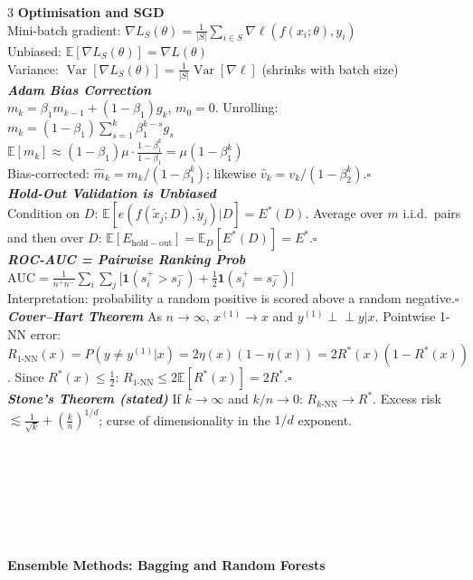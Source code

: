 \documentclass[a4paper,7pt]{article}
\begin{document}
\begin{multicols*}{3}
\textbf{Optimisation and SGD}\\
Mini-batch gradient: $\nabla L_S(\theta)=\frac{1}{|S|}\sum_{i\in S}\nabla\ell(f(x_i;\theta),y_i)$\\
Unbiased: $\mathbb{E}[\nabla L_S(\theta)]=\nabla L(\theta)$\\
Variance: $\operatorname{Var}[\nabla L_S(\theta)]=\frac{1}{|S|}\operatorname{Var}[\nabla\ell]$ (shrinks with batch size)\\

\textit{\textbf{Adam Bias Correction}}\\
$m_k=\beta_1 m_{k-1}+(1-\beta_1)g_k$, $m_0=0$. Unrolling:\\
$m_k=(1-\beta_1)\sum_{s=1}^k\beta_1^{k-s}g_s$\\
$\mathbb{E}[m_k]\approx(1-\beta_1)\mu\cdot\frac{1-\beta_1^k}{1-\beta_1}=\mu(1-\beta_1^k)$\\
Bias-corrected: $\hat m_k=m_k/(1-\beta_1^k)$; likewise $\hat v_k=v_k/(1-\beta_2^k)$.\hfill$\square$\\

\textit{\textbf{Hold-Out Validation is Unbiased}}\\
Condition on $D$: $\mathbb{E}[e(f(\tilde x_j;D),\tilde y_j)|D]=E^*(D)$. Average over $m$ i.i.d.\ pairs and then over $D$: $\mathbb{E}[E_\mathrm{hold-out}]=\mathbb{E}_D[E^*(D)]=E^*$.\hfill$\square$\\

\textit{\textbf{ROC-AUC = Pairwise Ranking Prob}}\\
$\mathrm{AUC}=\frac{1}{n^+n^-}\sum_i\sum_j\bigl[\mathbf{1}(s_i^+>s_j^-)+\tfrac{1}{2}\mathbf{1}(s_i^+=s_j^-)\bigr]$\\
Interpretation: probability a random positive is scored above a random negative.\hfill$\square$\\

\textit{\textbf{Cover--Hart Theorem}} As $n\to\infty$, $x^{(1)}\to x$ and $y^{(1)}\perp\!\!\!\perp y|x$. Pointwise 1-NN error: $R_{1\text{-NN}}(x)=P(y\neq y^{(1)}|x)=2\eta(x)(1-\eta(x))=2R^*(x)(1-R^*(x))$. Since $R^*(x)\leq\frac{1}{2}$: $R_{1\text{-NN}}\leq 2\mathbb{E}[R^*(x)]=2R^*$.\hfill$\square$\\

\textit{\textbf{Stone's Theorem (stated)}} If $k\to\infty$ and $k/n\to 0$: $R_{k\text{-NN}}\to R^*$. Excess risk $\lesssim\frac{1}{\sqrt{k}}+(\frac{k}{n})^{1/d}$; curse of dimensionality in the $1/d$ exponent.\\
\\\\\\\\\\\\\\
\textbf{Ensemble Methods: Bagging and Random Forests}\\


\end{multicols*}
\end{document}
